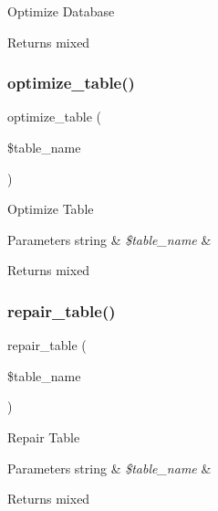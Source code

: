 Optimize Database

\begin{DoxyReturn}{Returns}
mixed 
\end{DoxyReturn}
\mbox{\label{class_c_i___d_b__utility_a6aed9274f43b64eeee607d172b51529d}} 
\subsubsection{\texorpdfstring{optimize\+\_\+table()}{optimize\_table()}}
{\footnotesize\ttfamily optimize\+\_\+table (\begin{DoxyParamCaption}\item[{}]{\$table\+\_\+name }\end{DoxyParamCaption})}

Optimize Table


\begin{DoxyParams}[1]{Parameters}
string & {\em \$table\+\_\+name} & \\
\hline
\end{DoxyParams}
\begin{DoxyReturn}{Returns}
mixed 
\end{DoxyReturn}
\mbox{\label{class_c_i___d_b__utility_a41a627004d26198c69bf466eef7eaeeb}} 
\subsubsection{\texorpdfstring{repair\+\_\+table()}{repair\_table()}}
{\footnotesize\ttfamily repair\+\_\+table (\begin{DoxyParamCaption}\item[{}]{\$table\+\_\+name }\end{DoxyParamCaption})}

Repair Table


\begin{DoxyParams}[1]{Parameters}
string & {\em \$table\+\_\+name} & \\
\hline
\end{DoxyParams}
\begin{DoxyReturn}{Returns}
mixed 
\end{DoxyReturn}
\mbox{\label{class_c_i___d_b__utility_a09decb7db409060365ad2c20072523f9}} 
